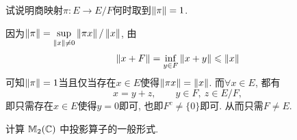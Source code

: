     \begin{ExtraExample}[Ps1022-5]
        试说明商映射$ \pi : E\to E/F $何时取到$ \left\| \pi \right\|=1 $.
    \end{ExtraExample}
    \begin{Solution}
    因为$ \left\| \pi \right\|=\sup\limits_{\left\| x \right\|\ne 0}\left\| \pi x \right\|/\left\| x \right\| $, 由
    \[
    \left\| x+F \right\|=\inf_{y\in F}\left\| x+y \right\|\leqslant \left\| x \right\|
    \]
    可知$ \left\| \pi \right\|=1 $当且仅当存在$ x\in E $使得$ \left\| \pi x \right\|=\left\| x \right\| $. 而$ \forall x\in E $, 都有
    \[
    x=y+z,\qquad y\in F,\ z\in E/F,
    \]
    即只需存在$ x\in E $使得$ y=0 $即可, 也即$ F^c\ne\{ 0 \} $即可. 从而只需$ F\ne E $.
    \end{Solution}

    \begin{ExtraExample}
        计算 $ \mathbb{M}_{2}(\mathbb{C}) $ 中投影算子的一般形式.
    \end{ExtraExample}
